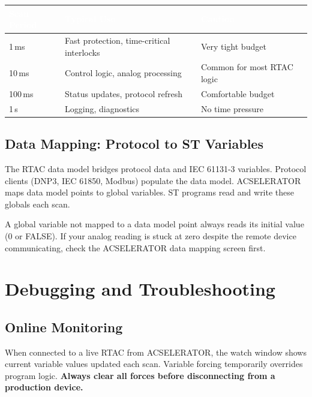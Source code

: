 \documentclass[12pt,twoside,openright]{memoir}
\begin{document}
\begin{center}
\begin{tabular}{C{2.5cm} L{4cm} L{5cm}}
\toprule
{} \textcolor{white}{\textbf{Scan Period}} & \textcolor{white}{\textbf{Typical Use}} & \textcolor{white}{\textbf{Caution}} \\
\midrule
{} 1\,ms  & Fast protection, time-critical interlocks & Very tight budget \\
10\,ms & Control logic, analog processing & Common for most RTAC logic \\
 100\,ms & Status updates, protocol refresh & Comfortable budget \\
1\,s   & Logging, diagnostics & No time pressure \\
\bottomrule
\end{tabular}
\end{center}

\section{Data Mapping: Protocol to ST Variables}

The RTAC data model bridges protocol data and IEC 61131-3 variables. Protocol clients (DNP3, IEC 61850, Modbus) populate the data model. ACSELERATOR maps data model points to global variables. ST programs read and write these globals each scan.

\begin{fieldgotcha}
A global variable not mapped to a data model point always reads its initial value (0 or FALSE). If your analog reading is stuck at zero despite the remote device communicating, check the ACSELERATOR data mapping screen first.
\end{fieldgotcha}

\chapter{Debugging and Troubleshooting}

\section{Online Monitoring}

When connected to a live RTAC from ACSELERATOR, the watch window shows current variable values updated each scan. Variable forcing temporarily overrides program logic. \textbf{Always clear all forces before disconnecting from a production device.}
\end{document}
